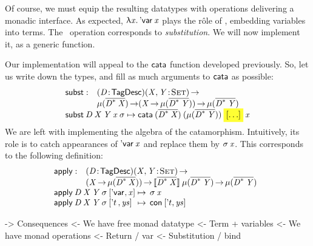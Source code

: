 Of course, we must equip the resulting datatypes with operations
delivering a monadic interface. As expected, \(\LAM{\x}\DVar{\x}\)
plays the r\^ole of \return, embedding variables into terms. The
\bind\ operation corresponds to \emph{substitution}. We will now
implement it, as a generic function.


\newcommand{\subst}{\F{subst}}
\newcommand{\apply}{\F{apply}}

Our implementation will appeal to the $\cata$ function developed
previously. So, let us write down the types, and fill as much
arguments to $\cata$ as possible:
%
\[\stk{
\begin{array}{@{}ll}
\subst : & \PITEL{\V{D}}{\TagDesc}
           \PI{\V{X}, \V{Y}}{\Set} \\
         & \Mu{(\toDesc{\FreeMonad{\V{D}}{\V{X}}})} \To
           (\V{X} \To \Mu{(\toDesc{\FreeMonad{\V{D}}{\V{Y}}})}) \To
           \Mu{(\toDesc{\FreeMonad{\V{D}}{\V{Y}}})} 
\end{array} \\
\subst\: \V{D}\: \V{X}\: \V{Y}\: \V{x}\: \V{\sigma} \mapsto
  \cata\: (\toDesc{\FreeMonad{\V{D}}{\V{X}}})\: 
          (\Mu{(\toDesc{\FreeMonad{\V{D}}{\V{Y}}})})\: 
          \SHED\: 
          \V{x}
}\]
%
We are left with implementing the algebra of the
catamorphism. Intuitively, its role is to catch appearances of
$\DVar{\V{x}}$ and replace them by $\V{\sigma}\: \V{x}$. This
corresponds to the following definition:
%
\[\stk{
\begin{array}{@{}ll}
\apply : & \PITEL{\V{D}}{\TagDesc} 
           \PI{\V{X}, \V{Y}}{\Set} \\
         & (\V{X} \To \Mu{(\toDesc{\FreeMonad{\V{D}}{\V{X}}})}) \To
           \descop{\toDesc{\FreeMonad{\V{D}}{\V{X}}}}{\Mu{(\toDesc{\FreeMonad{\V{D}}{\V{Y}}})}} \To
           \Mu{(\toDesc{\FreeMonad{\V{D}}{\V{Y}}})}
\\
\end{array} \\
\begin{array}{@{}l@{\:\mapsto\:\:}l}
\apply\: \V{D}\: \V{X}\: \V{Y}\: \V{\sigma}\: \pair{\DVar{\!}}{\V{x}}{}   & \V{\sigma}\: \V{x}                   \\
\apply\: \V{D}\: \V{X}\: \V{Y}\: \V{\sigma}\: \pair{\etag{t}\,}{\V{ys}}{} & \Con{\pair{\etag{t}}{\V{ys}}{}}
\end{array}
}\]

\begin{wstructure}
    -> Consequences
        <- We have free monad datatype
            <- Term + variables
        <- We have monad operations
            <- Return / var
            <- Substitution / bind
\end{wstructure}

